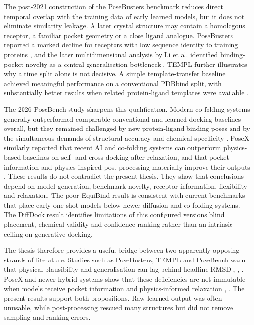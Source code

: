 The post-2021 construction of the PoseBusters benchmark reduces direct temporal overlap with the training data of early learned models, but it does not eliminate similarity leakage. A later crystal structure may contain a homologous receptor, a familiar pocket geometry or a close ligand analogue. PoseBusters reported a marked decline for receptors with low sequence identity to training proteins \cite{ref035}, and the later multidimensional analysis by Li et al. identified binding-pocket novelty as a central generalisation bottleneck \cite{ref013}. TEMPL further illustrates why a time split alone is not decisive. A simple template-transfer baseline achieved meaningful performance on a conventional PDBbind split, with substantially better results when related protein-ligand templates were available \cite{ref065}.

The 2026 PoseBench study sharpens this qualification. Modern co-folding systems generally outperformed comparable conventional and learned docking baselines overall, but they remained challenged by new protein-ligand binding poses and by the simultaneous demands of structural accuracy and chemical specificity \cite{ref069}. PoseX similarly reported that recent AI and co-folding systems can outperform physics-based baselines on self- and cross-docking after relaxation, and that pocket information and physics-inspired post-processing materially improve their outputs \cite{ref012}. These results do not contradict the present thesis. They show that conclusions depend on model generation, benchmark novelty, receptor information, flexibility and relaxation. The poor EquiBind result is consistent with current benchmarks that place early one-shot models below newer diffusion and co-folding systems. The DiffDock result identifies limitations of this configured version\textquotesingle s blind placement, chemical validity and confidence ranking rather than an intrinsic ceiling on generative docking.

The thesis therefore provides a useful bridge between two apparently opposing strands of literature. Studies such as PoseBusters, TEMPL and PoseBench warn that physical plausibility and generalisation can lag behind headline RMSD \cite{ref035}, \cite{ref065}, \cite{ref069}. PoseX and newer hybrid systems show that these deficiencies are not immutable when models receive pocket information and physics-informed relaxation \cite{ref012}, \cite{ref064}. The present results support both propositions. Raw learned output was often unusable, while post-processing rescued many structures but did not remove sampling and ranking errors.

